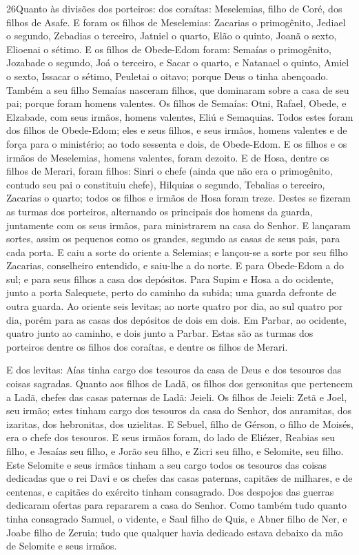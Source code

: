 \lettrine{26} Quanto às divisões dos porteiros: dos coraítas:
Meselemias, filho de Coré, dos filhos de Asafe. E foram os
filhos de Meselemias: Zacarias o primogênito, Jediael o segundo,
Zebadias o terceiro, Jatniel o quarto, Elão o quinto, Joanã o
sexto, Elioenai o sétimo. E os filhos de Obede-Edom foram:
Semaías o primogênito, Jozabade o segundo, Joá o terceiro, e Sacar o
quarto, e Natanael o quinto, Amiel o sexto, Issacar o sétimo,
Peuletai o oitavo; porque Deus o tinha abençoado. Também a seu
filho Semaías nasceram filhos, que dominaram sobre a casa de seu
pai; porque foram homens valentes. Os filhos de Semaías: Otni,
Rafael, Obede, e Elzabade, com seus irmãos, homens valentes, Eliú e
Semaquias. Todos estes foram dos filhos de Obede-Edom; eles e
seus filhos, e seus irmãos, homens valentes e de força para o
ministério; ao todo sessenta e dois, de Obede-Edom. E os filhos
e os irmãos de Meselemias, homens valentes, foram dezoito. E
de Hosa, dentre os filhos de Merari, foram filhos: Sinri o chefe
(ainda que não era o primogênito, contudo seu pai o constituiu
chefe), Hilquias o segundo, Tebalias o terceiro, Zacarias o
quarto; todos os filhos e irmãos de Hosa foram treze. Destes
se fizeram as turmas dos porteiros, alternando os principais dos
homens da guarda, juntamente com os seus irmãos, para ministrarem na
casa do Senhor. E lançaram sortes, assim os pequenos como os
grandes, segundo as casas de seus pais, para cada porta. E
caiu a sorte do oriente a Selemias; e lançou-se a sorte por seu
filho Zacarias, conselheiro entendido, e saiu-lhe a do norte.
E para Obede-Edom a do sul; e para seus filhos a casa dos
depósitos. Para Supim e Hosa a do ocidente, junto a porta
Salequete, perto do caminho da subida; uma guarda defronte de outra
guarda. Ao oriente seis levitas; ao norte quatro por dia, ao
sul quatro por dia, porém para as casas dos depósitos de dois em
dois. Em Parbar, ao ocidente, quatro junto ao caminho, e dois
junto a Parbar. Estas são as turmas dos porteiros dentre os
filhos dos coraítas, e dentre os filhos de Merari.

E dos levitas: Aías tinha cargo dos tesouros da casa de Deus e
dos tesouros das coisas sagradas. Quanto aos filhos de Ladã,
os filhos dos gersonitas que pertencem a Ladã, chefes das casas
paternas de Ladã: Jeieli. Os filhos de Jeieli: Zetã e Joel,
seu irmão; estes tinham cargo dos tesouros da casa do Senhor,
dos anramitas, dos izaritas, dos hebronitas, dos uzielitas.
E Sebuel, filho de Gérson, o filho de Moisés, era o chefe dos
tesouros. E seus irmãos foram, do lado de Eliézer, Reabias
seu filho, e Jesaías seu filho, e Jorão seu filho, e Zicri seu
filho, e Selomite, seu filho. Este Selomite e seus irmãos
tinham a seu cargo todos os tesouros das coisas dedicadas que o rei
Davi e os chefes das casas paternas, capitães de milhares, e de
centenas, e capitães do exército tinham consagrado. Dos
despojos das guerras dedicaram ofertas para repararem a casa do
Senhor. Como também tudo quanto tinha consagrado Samuel, o
vidente, e Saul filho de Quis, e Abner filho de Ner, e Joabe filho
de Zeruia; tudo que qualquer havia dedicado estava debaixo da mão de
Selomite e seus irmãos.

